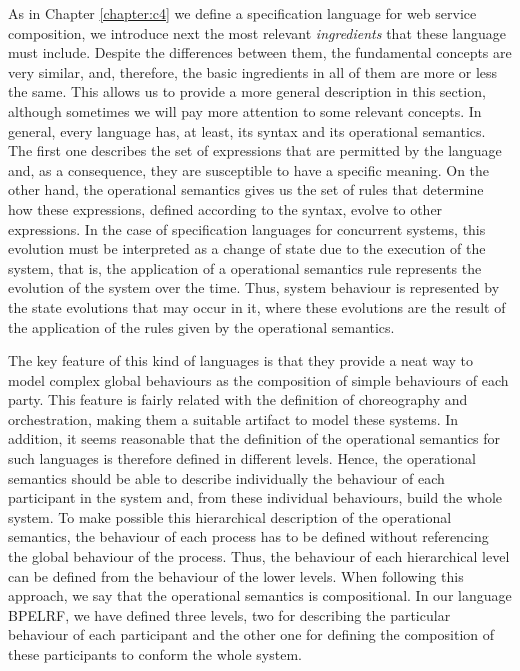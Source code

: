 As in Chapter \ref{chapter:c4} we define a specification language for web service composition, we introduce next
the most relevant \emph{ingredients} that these language must include. 
Despite the differences between them, the fundamental concepts
are very similar, and, therefore, the basic ingredients
in all of them are more or less the same. This allows us to provide a more general description
in this section, although sometimes we will pay more attention to
some relevant concepts.
In general, every language has, at least, its syntax and its operational semantics. 
The first one describes the set of expressions that are permitted by the 
language and, as a consequence, they are susceptible to have a specific meaning. On the other hand, the
operational semantics gives us the set of rules that determine how these expressions, defined according to the syntax, 
evolve to other expressions. In the case of specification languages
for concurrent systems, this evolution must be interpreted as a change of state
due to the execution of the system, that is, the application of a
operational semantics rule represents the evolution of the system over the time.
Thus, system behaviour is represented by the 
state evolutions that may occur in it, where these evolutions 
are the result of the application of the rules given by the operational semantics.

The key feature of this kind of languages is that they provide a neat way to model complex global behaviours as the composition of 
simple behaviours of each party. This feature is fairly related with the definition of choreography and orchestration, making them 
a suitable artifact to model these systems. In addition, it seems reasonable that the definition of
the operational semantics for such languages is therefore defined in different levels. Hence, 
the operational semantics should be able to describe individually the
behaviour of each participant in the system and, from these individual behaviours, build the whole system. 
To make possible this hierarchical description of the operational semantics,
the behaviour of each process has to be defined without referencing the global behaviour of the process. 
Thus, the behaviour of each hierarchical level can be defined from the behaviour 
of the lower levels. When following this approach, we say that the operational semantics is compositional. 
In our language BPELRF, we have defined three levels, two for describing
the particular behaviour of each participant and the other one for defining the composition of these participants 
to conform the whole system.

